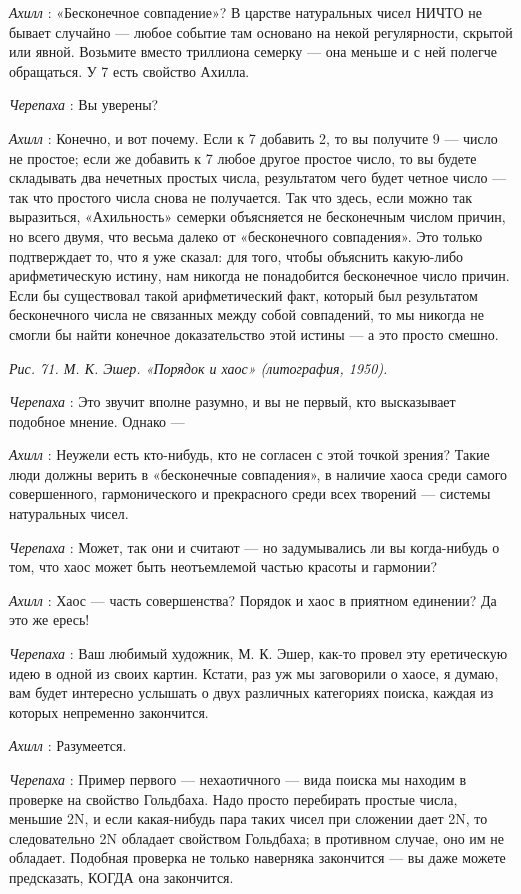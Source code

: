 \documentclass[../main.tex]{subfiles}
\begin{document}
\begin{dialogue}
\emph{Ахилл} : «Бесконечное совпадение»? В царстве натуральных чисел НИЧТО не бывает случайно --- любое событие там основано на некой регулярности, скрытой или явной. Возьмите вместо триллиона семерку --- она меньше и с ней полегче обращаться. У 7 есть свойство Ахилла.

\emph{Черепаха} : Вы уверены?

\emph{Ахилл} : Конечно, и вот почему. Если к 7 добавить 2, то вы получите 9 --- число не простое; если же добавить к 7 любое другое простое число, то вы будете складывать два нечетных простых числа, результатом чего будет четное число --- так что простого числа снова не получается. Так что здесь, если можно так выразиться, «Ахильность» семерки объясняется не бесконечным числом причин, но всего двумя, что весьма далеко от «бесконечного совпадения». Это только подтверждает то, что я уже сказал: для того, чтобы объяснить какую-либо арифметическую истину, нам никогда не понадобится бесконечное число причин. Если бы существовал такой арифметический факт, который был результатом бесконечного числа не связанных между собой совпадений, то мы никогда не смогли бы найти конечное доказательство этой истины --- а это просто смешно.

\emph{Рис. 71. М. К. Эшер. «Порядок и хаос» (литография, 1950).}

\emph{Черепаха} : Это звучит вполне разумно, и вы не первый, кто высказывает подобное мнение. Однако ---

\emph{Ахилл} : Неужели есть кто-нибудь, кто не согласен с этой точкой зрения? Такие люди должны верить в «бесконечные совпадения», в наличие хаоса среди самого совершенного, гармонического и прекрасного среди всех творений --- системы натуральных чисел.

\emph{Черепаха} : Может, так они и считают --- но задумывались ли вы когда-нибудь о том, что хаос может быть неотъемлемой частью красоты и гармонии?

\emph{Ахилл} : Хаос --- часть совершенства? Порядок и хаос в приятном единении? Да это же ересь!

\emph{Черепаха} : Ваш любимый художник, М. К. Эшер, как-то провел эту еретическую идею в одной из своих картин. Кстати, раз уж мы заговорили о хаосе, я думаю, вам будет интересно услышать о двух различных категориях поиска, каждая из которых непременно закончится.

\emph{Ахилл} : Разумеется.

\emph{Черепаха} : Пример первого --- нехаотичного --- вида поиска мы находим в проверке на свойство Гольдбаха. Надо просто перебирать простые числа, меньшие 2N, и если какая-нибудь пара таких чисел при сложении дает 2N, то следовательно 2N обладает свойством Гольдбаха; в противном случае, оно им не обладает. Подобная проверка не только наверняка закончится --- вы даже можете предсказать, КОГДА она закончится.


\end{dialogue}
\end{document}

